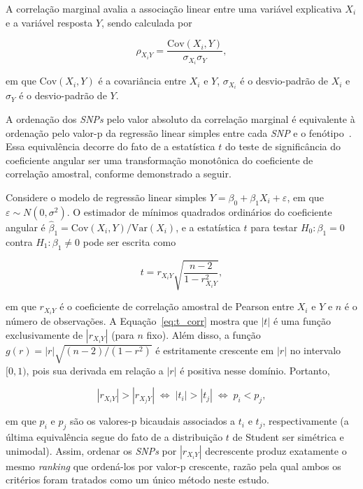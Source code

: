 \documentclass[12pt,fleqn]{article}
\begin{document}
A correlação marginal avalia a associação linear entre uma variável explicativa \(X_i\) e a variável resposta \(Y\), sendo calculada por

\begin{equation}
\rho_{X_{i}Y} = \frac{\text{Cov}(X_i, Y)}{\sigma_{X_i}\sigma_Y},
\end{equation}

\noindent em que $\text{Cov}(X_i,Y)$ é a covariância entre $X_i$ e $Y$, $\sigma_{X_i}$ é o desvio-padrão de $X_i$ e $\sigma_Y$ é o desvio-padrão de $Y$.

A ordenação dos \emph{SNPs} pelo valor absoluto da correlação marginal é equivalente à ordenação pelo valor-p da regressão linear simples entre cada \emph{SNP} e o fenótipo~\citep{moretin2023, FanLv2008}. Essa equivalência decorre do fato de a estatística $t$ do teste de significância do coeficiente angular ser uma transformação monotônica do coeficiente de correlação amostral, conforme demonstrado a seguir.

Considere o modelo de regressão linear simples $Y = \beta_0 + \beta_1 X_i + \varepsilon$, em que $\varepsilon \sim N(0, \sigma^2)$. O estimador de mínimos quadrados ordinários do coeficiente angular é $\hat{\beta}_1 = \text{Cov}(X_i, Y) / \text{Var}(X_i)$, e a estatística $t$ para testar $H_0\!: \beta_1 = 0$ contra $H_1\!: \beta_1 \neq 0$ pode ser escrita como

\begin{equation}
t = r_{X_iY} \sqrt{\frac{n-2}{1 - r_{X_iY}^2}},
\label{eq:t_corr}
\end{equation}

\noindent em que $r_{X_iY}$ é o coeficiente de correlação amostral de Pearson entre $X_i$ e $Y$ e $n$ é o número de observações. A Equação~\ref{eq:t_corr} mostra que $|t|$ é uma função exclusivamente de $|r_{X_iY}|$ (para $n$ fixo). Além disso, a função $g(r) = |r|\sqrt{(n-2)/(1-r^2)}$ é estritamente crescente em $|r|$ no intervalo $[0,1)$, pois sua derivada em relação a $|r|$ é positiva nesse domínio. Portanto,

\begin{equation}
|r_{X_iY}| > |r_{X_jY}| \;\Longleftrightarrow\; |t_i| > |t_j| \;\Longleftrightarrow\; p_i < p_j,
\label{eq:equivalencia}
\end{equation}

\noindent em que $p_i$ e $p_j$ são os valores-p bicaudais associados a $t_i$ e $t_j$, respectivamente (a última equivalência segue do fato de a distribuição $t$ de Student ser simétrica e unimodal). Assim, ordenar os \emph{SNPs} por $|r_{X_iY}|$ decrescente produz exatamente o mesmo \emph{ranking} que ordená-los por valor-p crescente, razão pela qual ambos os critérios foram tratados como um único método neste estudo.
\end{document}
